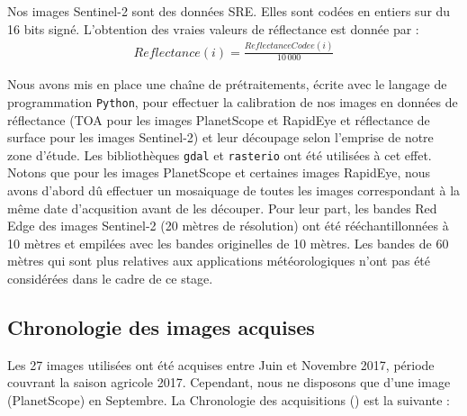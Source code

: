 \vspace{5mm}

Nos images Sentinel-2 sont des données SRE. Elles sont codées en entiers sur du 16 bits signé. L'obtention des vraies valeurs de réflectance est donnée par :
\begin{align}
  Reflectance (i) =  \frac{ReflectanceCodee(i)}{10\,000}
\end{align}

\vspace{5mm}
 
Nous avons mis en place une chaîne de prétraitements, écrite avec le langage de programmation \texttt{Python}, pour effectuer la calibration de nos images en données de 
réflectance (TOA pour les images PlanetScope et RapidEye et réflectance de surface pour les images Sentinel-2) et leur découpage selon l'emprise de notre zone d'étude. 
Les bibliothèques \texttt{gdal} et \texttt{rasterio} ont été utilisées à cet effet. Notons que pour les images PlanetScope et certaines images RapidEye, nous avons d'abord dû 
effectuer un mosaiquage de toutes les images correspondant à la même date d'acqusition avant de les découper. Pour leur part, les bandes Red Edge des images Sentinel-2 (20 mètres 
de résolution) ont été rééchantillonnées à 10 mètres et empilées avec les bandes originelles de 10 mètres. Les bandes de 60 mètres qui sont plus relatives aux applications 
météorologiques n'ont pas été considérées dans le cadre de ce stage.

  \subsection{Chronologie des images acquises}
  
Les 27 images utilisées ont été acquises entre Juin et Novembre 2017, période couvrant la saison agricole 2017. Cependant, nous ne disposons que d'une image (PlanetScope) en Septembre. La 
Chronologie des acquisitions () est la suivante :

